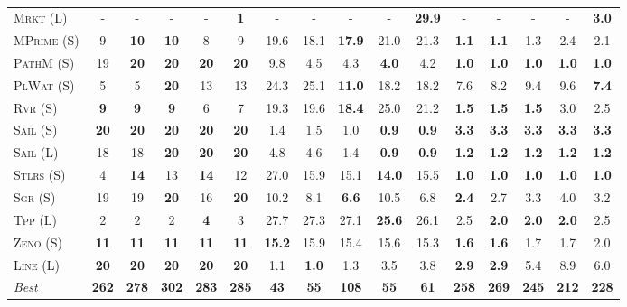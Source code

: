 \documentclass[11pt,landscape]{article}
\begin{document}
\begin{table*}[tb]
{\begin{tabular}{|l||ccccc||ccccc||ccccc||}
\textsc{Mrkt} (L)&-&-&-&-&\textbf{1}&-&-&-&-&\textbf{29.9}&-&-&-&-&\textbf{3.0}\\
\textsc{MPrime} (S)&9&\textbf{10}&\textbf{10}&8&9&19.6&18.1&\textbf{17.9}&21.0&21.3&\textbf{1.1}&\textbf{1.1}&1.3&2.4&2.1\\
\textsc{PathM} (S)&19&\textbf{20}&\textbf{20}&\textbf{20}&\textbf{20}&9.8&4.5&4.3&\textbf{4.0}&4.2&\textbf{1.0}&\textbf{1.0}&\textbf{1.0}&\textbf{1.0}&\textbf{1.0}\\
\textsc{PlWat} (S)&5&5&\textbf{20}&13&13&24.3&25.1&\textbf{11.0}&18.2&18.2&7.6&8.2&9.4&9.6&\textbf{7.4}\\
\textsc{Rvr} (S)&\textbf{9}&\textbf{9}&\textbf{9}&6&7&19.3&19.6&\textbf{18.4}&25.0&21.2&\textbf{1.5}&\textbf{1.5}&\textbf{1.5}&3.0&2.5\\
\textsc{Sail} (S)&\textbf{20}&\textbf{20}&\textbf{20}&\textbf{20}&\textbf{20}&1.4&1.5&1.0&\textbf{0.9}&\textbf{0.9}&\textbf{3.3}&\textbf{3.3}&\textbf{3.3}&\textbf{3.3}&\textbf{3.3}\\
\textsc{Sail} (L)&18&18&\textbf{20}&\textbf{20}&\textbf{20}&4.8&4.6&1.4&\textbf{0.9}&\textbf{0.9}&\textbf{1.2}&\textbf{1.2}&\textbf{1.2}&\textbf{1.2}&\textbf{1.2}\\
\textsc{Stlrs} (S)&4&\textbf{14}&13&\textbf{14}&12&27.0&15.9&15.1&\textbf{14.0}&15.5&\textbf{1.0}&\textbf{1.0}&\textbf{1.0}&\textbf{1.0}&\textbf{1.0}\\
\textsc{Sgr} (S)&19&19&\textbf{20}&16&\textbf{20}&10.2&8.1&\textbf{6.6}&10.5&6.8&\textbf{2.4}&2.7&3.3&4.0&3.2\\
\textsc{Tpp} (L)&2&2&2&\textbf{4}&3&27.7&27.3&27.1&\textbf{25.6}&26.1&2.5&\textbf{2.0}&\textbf{2.0}&\textbf{2.0}&2.5\\
\textsc{Zeno} (S)&\textbf{11}&\textbf{11}&\textbf{11}&\textbf{11}&\textbf{11}&\textbf{15.2}&15.9&15.4&15.6&15.3&\textbf{1.6}&\textbf{1.6}&1.7&1.7&2.0\\
\textsc{Line} (L)&\textbf{20}&\textbf{20}&\textbf{20}&\textbf{20}&\textbf{20}&1.1&\textbf{1.0}&1.3&3.5&3.8&\textbf{2.9}&\textbf{2.9}&5.4&8.9&6.0
\\\hline
\textit{Best}&\textbf{262}&\textbf{278}&\textbf{302}&\textbf{283}&\textbf{285}&\textbf{43}&\textbf{55}&\textbf{108}&\textbf{55}&\textbf{61}&\textbf{258}&\textbf{269}&\textbf{245}&\textbf{212}&\textbf{228}\\\hline

        \end{tabular}}
        \caption{}
        \label{tab:all-patty}
        \end{table*}
        
\end{document}
